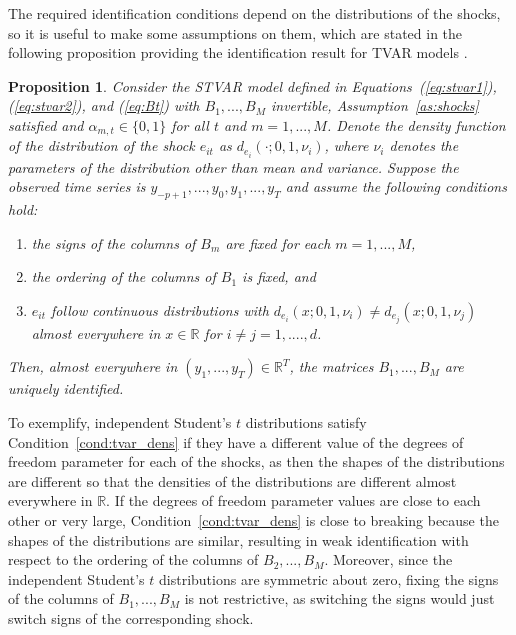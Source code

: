 \documentclass[nojss]{jss}
\newtheorem{proposition}{Proposition}
\begin{document}
The required identification conditions depend on the distributions of the shocks, so it is useful to make some assumptions on them, which are stated in the following proposition providing the identification result for TVAR models \citep[][Proposition~1]{Virolainen2:2024}.
%
\begin{proposition}\label{prop:tvar_ident}
Consider the STVAR model defined in Equations~(\ref{eq:stvar1}), (\ref{eq:stvar2}), and (\ref{eq:Bt}) with $B_1,...,B_M$ invertible, Assumption~\ref{as:shocks} satisfied and $\alpha_{m,t}\in\lbrace 0, 1\rbrace$ for all $t$ and $m=1,...,M$.
Denote the density function of the distribution of the shock $e_{it}$ as $d_{e_i}(\cdot ; 0, 1, \nu_i)$, where $\nu_i$ denotes the parameters of the distribution other than mean and variance.
Suppose the observed time series is $y_{-p+1},...,y_{0},y_{1},...,y_{T}$ and assume the following conditions hold:
\begin{enumerate}%
\item the signs of the columns of $B_m$ are fixed for each $m=1,...,M$, \label{cond:tvar_sign}
\item the ordering of the columns of $B_1$ is fixed, and\label{cond:tvar_B1}
\item $e_{it}$ follow continuous distributions with $d_{e_i}(x; 0, 1, \nu_i) \neq d_{e_j}(x; 0, 1, \nu_j)$ almost everywhere in $x\in\mathbb{R}$ for $i\neq j = 1,....,d$.\label{cond:tvar_dens}
\end{enumerate}
Then, almost everywhere in $(y_{1},...,y_{T}) \in \mathbb{R}^{T}$, the matrices $B_1,...,B_M$ are uniquely identified.
\end{proposition}
%

To exemplify, independent Student's $t$ distributions satisfy Condition~\ref{cond:tvar_dens} if they have a different value of the degrees of freedom parameter for each of the shocks, as then the shapes of the distributions are different so that the densities of the distributions are different almost everywhere in $\mathbb{R}$. If the degrees of freedom parameter values are close to each other or very large, Condition~\ref{cond:tvar_dens} is close to breaking because the shapes of the distributions are similar, resulting in weak identification with respect to the ordering of the columns of $B_2,...,B_M$. Moreover, since the independent Student's $t$ distributions are symmetric about zero, fixing the signs of the columns of $B_1,...,B_M$ is not restrictive, as switching the signs would just switch signs of the corresponding shock.
\end{document}
